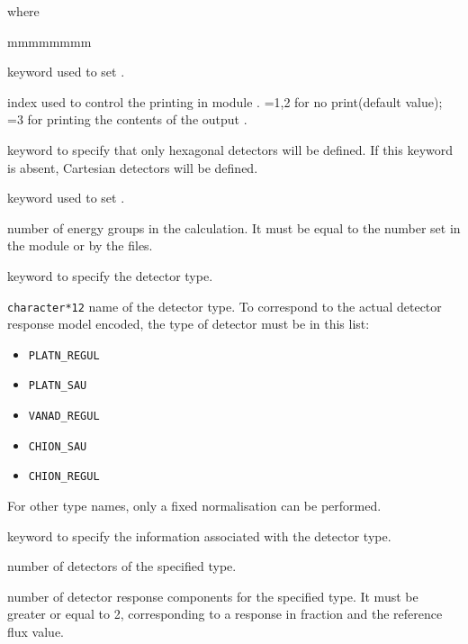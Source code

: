 \noindent where
\begin{ListeDeDescription}{mmmmmmmm}

\item[\moc{EDIT}] keyword used to set .

\item[\dusa{iprt}] index used to control the printing in module . =1,2 for no print(default value); =3 for printing the contents 
of the output .

\item[\moc{HEXZ}] keyword to specify that only hexagonal detectors will be 
defined.
If this keyword is absent, Cartesian detectors will be
defined. 

\item[\moc{NGRP}] keyword used to set .

\item[\dusa{ngrp}] number of energy groups in the calculation. It must be
equal to the number set in the  module or by the 
files. 

\item[\moc{TYPE}] keyword to specify the detector type.

\item[\dusa{NAMTYP}] \texttt{character*12} name of the detector type.
To correspond to the actual detector response model encoded,
the type of detector must be in this list: 
\begin{itemize}
\item  \texttt{PLATN\_REGUL}
\item  \texttt{PLATN\_SAU}
\item  \texttt{VANAD\_REGUL} 
\item  \texttt{CHION\_SAU}
\item  \texttt{CHION\_REGUL} 
\end{itemize}
For other type names, only a fixed normalisation can be performed.

\item[\moc{INFO}] keyword to specify the information associated 
with the detector type.

\item[\dusa{ndetect}] number of detectors of the specified type.

\item[\dusa{nrep}] number of detector response components for the specified 
type. It must be greater or equal to 2, corresponding to a response in
fraction and the reference flux value.
 

\end{ListeDeDescription}
